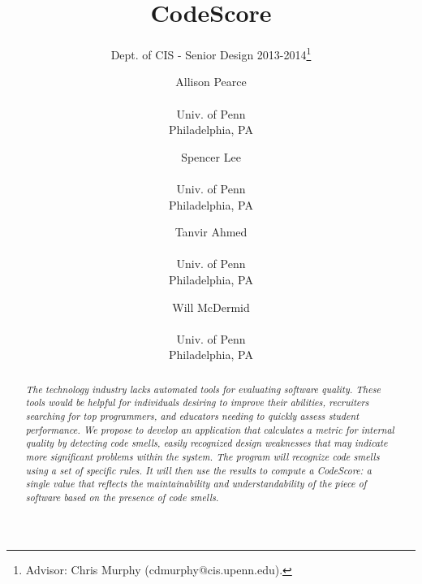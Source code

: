 \documentclass{sig-alternate}
\begin{document}
 

\title{CodeScore}
\subtitle{Dept. of CIS - Senior Design 2013-2014\thanks{Advisor: Chris Murphy (cdmurphy@cis.upenn.edu).}}

\author{
Allison Pearce \\  \\ Univ. of Penn \\ Philadelphia, PA
\and Spencer Lee \\  \\ Univ. of Penn \\ Philadelphia, PA
\and Tanvir Ahmed \\  \\ Univ. of Penn \\ Philadelphia, PA
\and Will McDermid \\  \\ Univ. of Penn \\ Philadelphia, PA}

\date{}
\maketitle

\begin{abstract}
  \textit{The technology industry lacks automated tools for evaluating software quality. These tools would be helpful for individuals desiring to improve their abilities, recruiters searching for top programmers, and educators needing to quickly assess student performance. We propose to develop an application that calculates a metric for internal quality by detecting code smells, easily recognized design weaknesses that may indicate more significant problems within the system. The program will recognize code smells using a set of specific rules. It will then use the results to compute a CodeScore: a single value that reflects the maintainability and understandability of the piece of software based on the presence of code smells. }
\end{abstract}

\end{document}
